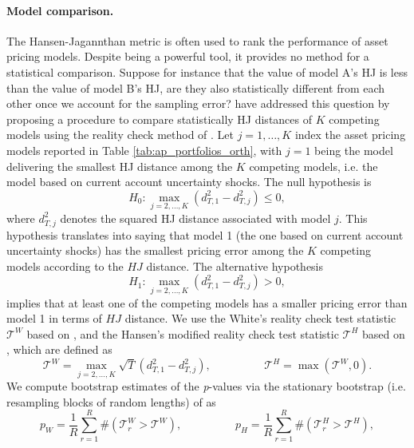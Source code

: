 \paragraph{Model comparison.}
The Hansen-Jagannthan metric is often used to rank the performance of asset pricing models. Despite being a powerful tool, it provides no method for a statistical comparison. Suppose for instance that the value of model A's HJ is less than the value of model B's HJ, are they also statistically different from each other once we account for the sampling error? \citet{Chen_Ludvigson2009} have addressed this question by proposing a procedure to compare statistically HJ distances of $K$ competing models using the reality check method of \citet{white:2000}. Let $j=1, \ldots, K$ index the asset pricing models reported in Table \ref{tab:ap_portfolios_orth}, with $j=1$ being the model delivering the smallest HJ distance among the $K$ competing models, i.e. the model based on current account uncertainty shocks. The null hypothesis is
\begin{equation} \label{eq:NULL}
	H_0 : \max_{j=2,\ldots,K} (d_{T,1}^2 - d_{T,j}^2) \leq 0,
\end{equation}
where $d_{T,j}^2$ denotes the squared HJ distance associated with model $j$. This hypothesis translates into saying that model 1 (the one based on current account uncertainty shocks) has the smallest pricing error among the $K$ competing models according to the $HJ$ distance. The alternative hypothesis
\begin{equation} \label{eq:ALT}
	H_1 : \max_{j=2,\ldots,K} (d_{T,1}^2 - d_{T,j}^2) > 0,
\end{equation}
implies that at least one of the competing models has a smaller pricing error than model 1 in terms of $HJ$ distance. We use the White's reality check test statistic $\mathcal{T}^W$ based on \citet{white:2000}, and the Hansen's modified reality check test statistic $\mathcal{T}^H$ based on \citet{hansen:2005}, which are defined as
\begin{equation} \label{eq:Stats}
	\mathcal{T}^{W} = \max_{j=2,\ldots,K}  \sqrt{T} (d_{T,1}^2 - d_{T,j}^2), \hspace{2cm}  \mathcal{T}^{H} = \max (\mathcal{T}^{W}, 0).
\end{equation}
We compute bootstrap estimates of the \emph{p}-values via the stationary bootstrap (i.e. resampling blocks of random lengths) of \citet{politis/romano:94} as
\begin{equation}
	p_W = \frac{1}{R} \sum_{r=1}^R \# (\mathcal{T}^{W}_{r} > \mathcal{T}^W), \hspace{2cm}  p_H = \frac{1}{R} \sum_{r=1}^R \# (\mathcal{T}^{H}_{r} > \mathcal{T}^H),
\end{equation}
